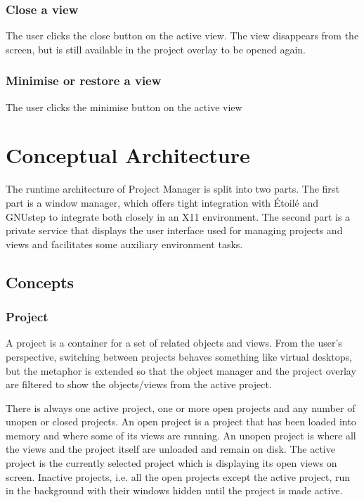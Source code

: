 \documentclass[11pt]{report}
\newcommand{\etoile}{\'Etoil\'e\xspace}
\begin{document}
\subsection{Close a view}
The user clicks the close button on the active view. The view disappears from the screen, but is still available in the project overlay to be opened again.

\subsection{Minimise or restore a view}
The user clicks the minimise button on the active view

\chapter{Conceptual Architecture}

The runtime architecture of Project Manager is split into two parts. The first part is a window manager, which offers tight integration with \etoile and GNUstep to integrate both closely in an X11 environment. The second part is a private service that displays the user interface used for managing projects and views and facilitates some auxiliary environment tasks.

\section{Concepts}
\subsection{Project}
A project is a container for a set of related objects and views. From the user's perspective, switching between projects behaves something like virtual desktops, but the metaphor is extended so that the object manager and the project overlay are filtered to show the objects/views from the active project.

There is always one active project, one or more open projects and any number of unopen or closed projects. An open project is a project that has been loaded into memory and where some of its views are running. An unopen project is where all the views and the project itself are unloaded and remain on disk. The active project is the currently selected project which is displaying its open views on screen. Inactive projects, i.e. all the open projects except the active project, run in the background with their windows hidden until the project is made active.
\end{document}
